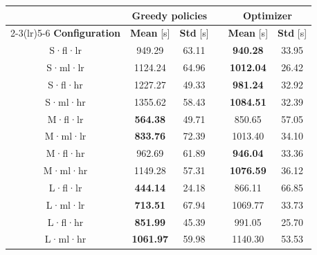 \begin{tabular}{@{}c cc c cc@{}}
\toprule
& \multicolumn{2}{c}{\textbf{Greedy policies}} & & \multicolumn{2}{c}{\textbf{Optimizer}} \\
\cmidrule(lr){2-3}\cmidrule(lr){5-6}
\textbf{Configuration} & \textbf{Mean} [\unit{\second}] & \textbf{Std} [\unit{\second}] & & \textbf{Mean} [\unit{\second}] & \textbf{Std} [\unit{\second}] \\
\midrule
S·fl·lr & 949.29 & 63.11 & & \textbf{940.28} & 33.95 \\
S·ml·lr & 1124.24 & 64.96 & & \textbf{1012.04} & 26.42 \\
S·fl·hr & 1227.27 & 49.33 & & \textbf{981.24} & 32.92 \\
S·ml·hr & 1355.62 & 58.43 & & \textbf{1084.51} & 32.39 \\
\addlinespace
M·fl·lr & \textbf{564.38} & 49.71 & & 850.65 & 57.05 \\
M·ml·lr & \textbf{833.76} & 72.39 & & 1013.40 & 34.10 \\
M·fl·hr & 962.69 & 61.89 & & \textbf{946.04} & 33.36 \\
M·ml·hr & 1149.28 & 57.31 & & \textbf{1076.59} & 36.12 \\
\addlinespace
L·fl·lr & \textbf{444.14} & 24.18 & & 866.11 & 66.85 \\
L·ml·lr & \textbf{713.51} & 67.94 & & 1069.77 & 33.73 \\
L·fl·hr & \textbf{851.99} & 45.39 & & 991.05 & 25.70 \\
L·ml·hr & \textbf{1061.97} & 59.98 & & 1140.30 & 53.53 \\
\bottomrule
\end{tabular}